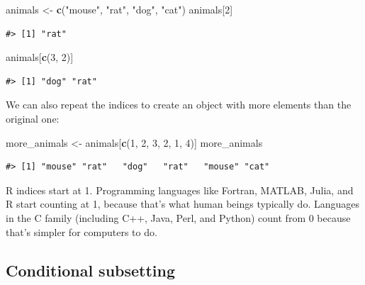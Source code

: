 \documentclass[]{book}
\newenvironment{Shaded}{\begin{snugshade}}{\end{snugshade}}
\newcommand{\KeywordTok}[1]{\textcolor[rgb]{0.13,0.29,0.53}{\textbf{{#1}}}}
\newcommand{\DecValTok}[1]{\textcolor[rgb]{0.00,0.00,0.81}{{#1}}}
\newcommand{\StringTok}[1]{\textcolor[rgb]{0.31,0.60,0.02}{{#1}}}
\newcommand{\NormalTok}[1]{{#1}}
\theoremstyle{definition}
\theoremstyle{definition}
\theoremstyle{remark}
\begin{document}
\begin{Shaded}
\begin{Highlighting}[]
\NormalTok{animals <-}\StringTok{ }\KeywordTok{c}\NormalTok{(}\StringTok{"mouse"}\NormalTok{, }\StringTok{"rat"}\NormalTok{, }\StringTok{"dog"}\NormalTok{, }\StringTok{"cat"}\NormalTok{)}
\NormalTok{animals[}\DecValTok{2}\NormalTok{]}
\end{Highlighting}
\end{Shaded}

\begin{verbatim}
#> [1] "rat"
\end{verbatim}

\begin{Shaded}
\begin{Highlighting}[]
\NormalTok{animals[}\KeywordTok{c}\NormalTok{(}\DecValTok{3}\NormalTok{, }\DecValTok{2}\NormalTok{)]}
\end{Highlighting}
\end{Shaded}

\begin{verbatim}
#> [1] "dog" "rat"
\end{verbatim}

We can also repeat the indices to create an object with more elements
than the original one:

\begin{Shaded}
\begin{Highlighting}[]
\NormalTok{more_animals <-}\StringTok{ }\NormalTok{animals[}\KeywordTok{c}\NormalTok{(}\DecValTok{1}\NormalTok{, }\DecValTok{2}\NormalTok{, }\DecValTok{3}\NormalTok{, }\DecValTok{2}\NormalTok{, }\DecValTok{1}\NormalTok{, }\DecValTok{4}\NormalTok{)]}
\NormalTok{more_animals}
\end{Highlighting}
\end{Shaded}

\begin{verbatim}
#> [1] "mouse" "rat"   "dog"   "rat"   "mouse" "cat"
\end{verbatim}

R indices start at 1. Programming languages like Fortran, MATLAB, Julia,
and R start counting at 1, because that's what human beings typically
do. Languages in the C family (including C++, Java, Perl, and Python)
count from 0 because that's simpler for computers to do.

\subsection{Conditional subsetting}\label{conditional-subsetting}
\end{document}

